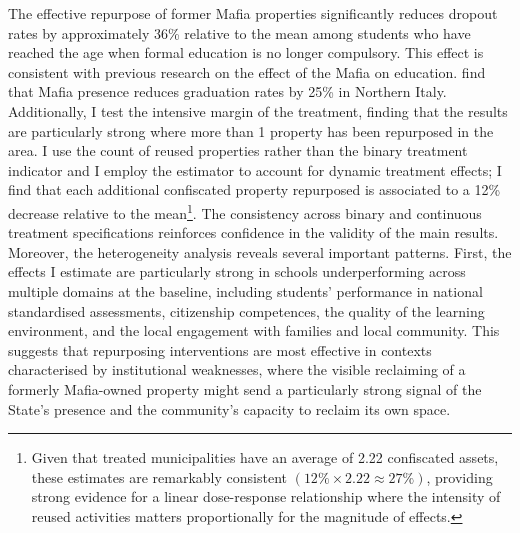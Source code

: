 \documentclass[12pt]{article}
\theoremstyle{plain}
\theoremstyle{plain}
\theoremstyle{plain}
\theoremstyle{definition}
\theoremstyle{plain}
\theoremstyle{definition}
\theoremstyle{plain}
\theoremstyle{remark}
\theoremstyle{definition}
\theoremstyle{definition}
\theoremstyle{plain}
\begin{document}
\medskip
The effective repurpose of former Mafia properties significantly reduces dropout rates by approximately 36\% relative to the mean among students who have reached the age when formal education is no longer compulsory. This effect is  consistent with previous research on the effect of the Mafia on education. \citet{caglayan_hindering_2021} find that Mafia presence reduces graduation rates by 25\% in Northern Italy.  Additionally, I test the intensive margin of the treatment, finding that the results are particularly strong where more than 1 property has been repurposed in the area. I use the count of reused properties rather than the binary treatment indicator and I employ the \citet{de_chaisemartin_difference--differences_2024} estimator to account for dynamic treatment effects; I find that each additional confiscated property repurposed is associated to a 12\% decrease relative to the mean\footnote{Given that treated municipalities have an average of 2.22 confiscated assets, these estimates are remarkably consistent $(12\% \times 2.22 \approx 27\%)$, providing strong evidence for a linear dose-response relationship where the intensity of reused activities matters proportionally for the magnitude of effects.}. The consistency across binary and continuous treatment specifications reinforces confidence in the validity of the main results.  \\
Moreover, the heterogeneity analysis reveals several important patterns. First, the effects I estimate are particularly strong in schools underperforming across multiple domains at the baseline, including students’ performance in national standardised assessments, citizenship competences, the quality of the learning environment, and the local engagement with families and local community. This suggests that repurposing interventions are most effective in contexts characterised by institutional weaknesses, where the visible reclaiming of a formerly Mafia-owned property might send a particularly strong signal of the State's presence and the community's capacity to reclaim its own space.
\end{document}
